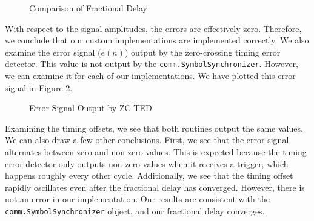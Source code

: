 \documentclass{article}
\begin{document}
\begin{figure}[H]
	\centerline{}
	\caption{Comparison of Fractional Delay}
	\label{fig::fractional_delay_error}
\end{figure}

\noindent With respect to the signal amplitudes, the errors are effectively zero. Therefore, we conclude that our custom implementations are implemented correctly. We also examine the error signal ($e(n)$) output by the zero-crossing timing error detector. This value is not output by the \texttt{comm.SymbolSynchronizer}. However, we can examine it for each of our implementations.  We have plotted this error signal in Figure \ref{fig::timing_offset}. 

\begin{figure}[H]
	\centerline{}
	\caption{Error Signal Output by ZC TED}
	\label{fig::timing_offset}
\end{figure}

\noindent Examining the timing offsets, we see that both routines output the same values. We can also draw a few other conclusions. First, we see that the error signal alternates between zero and non-zero values. This is expected because the timing error detector only outputs non-zero values when it receives a trigger, which happens roughly every other cycle. Additionally, we see that the timing offset rapidly oscillates even after the fractional delay has converged. However, there is not an error in our implementation. Our results are consistent with the \texttt{comm.SymbolSynchronizer} object, and our fractional delay converges.
\end{document}
